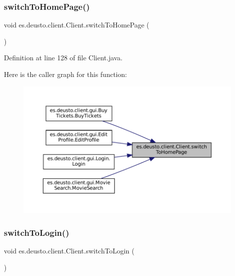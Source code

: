 \subsubsection{\texorpdfstring{switchToHomePage()}{switchToHomePage()}}
{\footnotesize\ttfamily void es.\+deusto.\+client.\+Client.\+switch\+To\+Home\+Page (\begin{DoxyParamCaption}{ }\end{DoxyParamCaption})}



Definition at line 128 of file Client.\+java.

Here is the caller graph for this function\+:
\nopagebreak
\begin{figure}[H]
\begin{center}
\leavevmode
\includegraphics[width=350pt]{classes_1_1deusto_1_1client_1_1_client_aff17deef622ce410b473d4dadad36343_icgraph}
\end{center}
\end{figure}
\mbox{\label{classes_1_1deusto_1_1client_1_1_client_a66fff847d9f168900f6992fd4eff5e3d}} 
\subsubsection{\texorpdfstring{switchToLogin()}{switchToLogin()}}
{\footnotesize\ttfamily void es.\+deusto.\+client.\+Client.\+switch\+To\+Login (\begin{DoxyParamCaption}{ }\end{DoxyParamCaption})}



